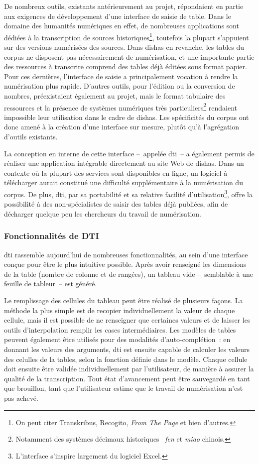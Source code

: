 \documentclass[a4paper,12pt,twoside]{book}
\newcommand{\eng}{\emph}
\newcommand{\g}[1]{\og#1~\fg}
\newcommand{\dishas}{\gls{dishas}\xspace}
\newcommand{\dti}{\gls{dti}\xspace}
\begin{document}
De nombreux outils, existants antérieurement au projet, répondaient en partie aux exigences de développement d'une interface de saisie de table. Dans le domaine des humanités numériques en effet, de nombreuses applications sont dédiées à la transcription de sources historiques\footnote{On peut citer Transkribus, Recogito, \eng{From The Page} et bien d'autres.}, toutefois la plupart s'appuient sur des versions numérisées des sources. Dans \dishas en revanche, les tables du corpus ne disposent pas nécessairement de numérisation, et une importante partie des ressources à transcrire comprend des tables déjà éditées sous format papier. Pour ces dernières, l'interface de saisie a principalement vocation à rendre la numérisation plus rapide. D'autres outils, pour l'édition ou la conversion de nombres, préexistaient également au projet, mais le format tabulaire des ressources et la présence de systèmes numériques très particuliers\footnote{Notamment des systèmes \g{décimaux historiques} \eng{fen} et \eng{miao} chinois.} rendaient impossible leur utilisation dans le cadre de \dishas. Les spécificités du corpus ont donc amené à la création d'une interface sur mesure, plutôt qu'à l'agrégation d'outils existants.

La conception en interne de cette interface –~appelée \dti~– a également permis de réaliser une application intégrable directement au site Web de \dishas. Dans un contexte où la plupart des services sont disponibles en ligne, un logiciel à télécharger aurait constitué une difficulté supplémentaire à la numérisation du corpus. De plus, \dti, par sa portabilité et sa relative facilité d'utilisation\footnote{L'interface s'inspire largement du logiciel Excel.}, offre la possibilité à des non-spécialistes de saisir des tables déjà publiées, afin de décharger quelque peu les chercheurs du travail de numérisation.

			\subsubsection{Fonctionnalités de DTI}
\dti rassemble aujourd'hui de nombreuses fonctionnalités, au sein d'une interface conçue pour être le plus intuitive possible. Après avoir renseigné les dimensions de la table (nombre de colonne et de rangées), un tableau vide –~semblable à une feuille de tableur~– est généré.

Le remplissage des cellules du tableau peut être réalisé de plusieurs façons. La méthode la plus simple est de recopier individuellement la valeur de chaque cellule, mais il est possible de ne renseigner que certaines valeurs et de laisser les outils d'interpolation remplir les cases intermédiaires. Les modèles de tables peuvent également être utilisés pour des modalités d'auto-complétion~: en donnant les valeurs des arguments, \dti est ensuite capable de calculer les valeurs des celulles de la tables, selon la fonction définie dans le modèle. Chaque cellule doit ensuite être validée individuellement par l'utilisateur, de manière à assurer la qualité de la transcription. Tout état d'avancement peut être sauvegardé en tant que brouillon, tant que l'utilisateur estime que le travail de numérisation n'est pas achevé.
\end{document}
